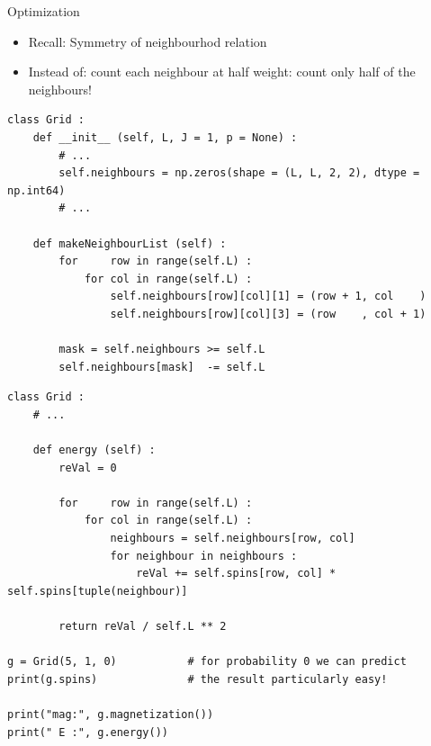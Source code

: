 
\begin{frame}[fragile]{Optimization}
%
\begin{itemize}
\item Recall: Symmetry of neighbourhod relation
\item Instead of: count each neighbour at half weight: count only half of the neighbours!
\end{itemize}
%
\begin{codebox}
\begin{verbatim}
class Grid :
    def __init__ (self, L, J = 1, p = None) :
        # ...
        self.neighbours = np.zeros(shape = (L, L, 2, 2), dtype = np.int64)
        # ...
    
    def makeNeighbourList (self) :
        for     row in range(self.L) :
            for col in range(self.L) :
                self.neighbours[row][col][1] = (row + 1, col    )
                self.neighbours[row][col][3] = (row    , col + 1)
                
        mask = self.neighbours >= self.L
        self.neighbours[mask]  -= self.L
\end{verbatim}
\end{codebox}
%
\end{frame}


\begin{frame}[fragile]
%
\begin{codebox}
\begin{verbatim}
class Grid :
    # ...
    
    def energy (self) :
        reVal = 0
        
        for     row in range(self.L) :
            for col in range(self.L) :
                neighbours = self.neighbours[row, col]
                for neighbour in neighbours :
                    reVal += self.spins[row, col] * self.spins[tuple(neighbour)]
        
        return reVal / self.L ** 2

g = Grid(5, 1, 0)           # for probability 0 we can predict
print(g.spins)              # the result particularly easy!

print("mag:", g.magnetization())
print(" E :", g.energy())
\end{verbatim}
\end{codebox}
%
\end{frame}

